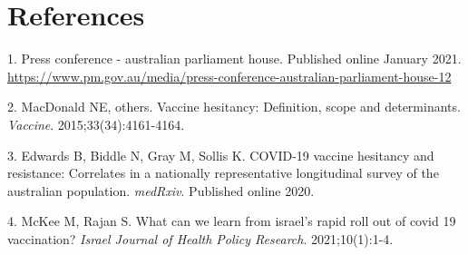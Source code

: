 \documentclass{article}
\begin{document}
\hypertarget{references}{%
\section*{References}\label{references}}

\hypertarget{refs}{}
\leavevmode\hypertarget{ref-pm2021}{}%
1. Press conference - australian parliament house. Published online
January 2021.
\url{https://www.pm.gov.au/media/press-conference-australian-parliament-house-12}

\leavevmode\hypertarget{ref-macdonald2015vaccine}{}%
2. MacDonald NE, others. Vaccine hesitancy: Definition, scope and
determinants. \emph{Vaccine}. 2015;33(34):4161-4164.

\leavevmode\hypertarget{ref-edwards2020covid}{}%
3. Edwards B, Biddle N, Gray M, Sollis K. COVID-19 vaccine hesitancy and
resistance: Correlates in a nationally representative longitudinal
survey of the australian population. \emph{medRxiv}. Published online
2020.

\leavevmode\hypertarget{ref-mckee2021can}{}%
4. McKee M, Rajan S. What can we learn from israel's rapid roll out of
covid 19 vaccination? \emph{Israel Journal of Health Policy Research}.
2021;10(1):1-4.



\end{document}

